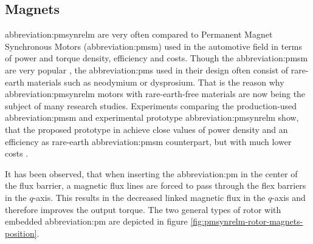 \documentclass[a4paper, twoside, 11pt]{article}
\begin{document}
\begin{figure}[H]
\end{figure}

    \subsection{Magnets}
        \gls{abbreviation:pmsynrelm} are very often compared to Permanent Magnet Synchronous Motors (\gls{abbreviation:pmsm}) used in the automotive field in terms of power and torque density, efficiency and costs. Though the \gls{abbreviation:pmsm} are very popular \cite{morimoto-experimental-evaulation-of-a-rare-earth-free-pmasynrm-with-ferrite-magnets-for-automotive-applications}, the \gls{abbreviation:pm}s used in their design often consist of rare-earth materials such as neodymium or dysprosium. That is the reason why \gls{abbreviation:pmsynrelm} motors with rare-earth-free materials are now being the subject of many research studies. Experiments comparing the production-used \gls{abbreviation:pmsm} and experimental prototype \gls{abbreviation:pmsynrelm} show, that the proposed prototype in \cite{mashiro-performance-of-mpasynrm-with-ferrite-magnets-for-ev-hv-applications-considering-productivity} achieve close values of power density and an efficiency as rare-earth \gls{abbreviation:pmsm} counterpart, but with much lower costs \cite{haiwei-low-cost-ferrite-pm-assisted-synchronous-reluctance-machine-for-electric-vehicles}.\par
It has been observed, that when inserting the \gls{abbreviation:pm} in the center of the flux barrier, a magnetic flux lines are forced to pass through the flex barriers in the $q$-axis. This results in the decreased linked magnetic flux in the $q$-axis and therefore improves the output torque. \cite{ibrahim-permanent-magnet-assisted-synchronous-reluctance-motor-employing-a-hybrid-star-delta-winding-for-high-speed-applicaitons, ngo-performance-analysis-of-synchronous-reluctance-motor-with-limited-amount-of-permanent-magnet} The two general types of rotor with embedded \gls{abbreviation:pm} are depicted in figure \ref{fig:pmsynrelm-rotor-magnets-position}.
\end{document}

